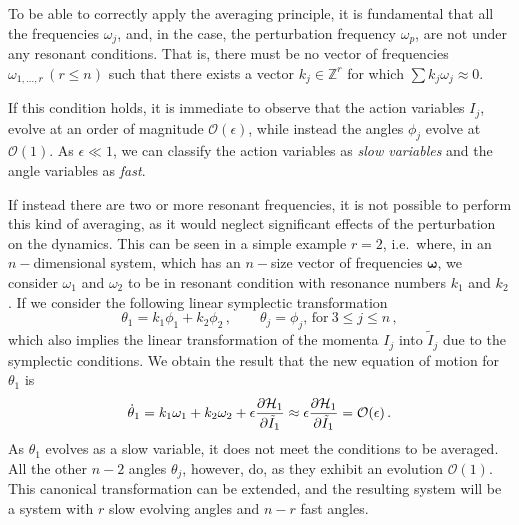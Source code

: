 To be able to correctly apply the averaging principle, it is fundamental that all the frequencies $\omega_j$, and, in the case, the perturbation frequency $\omega_p$, are not under any resonant conditions. That is, there must be no vector of frequencies $\omega_{1,\ldots,r}\,(r\leq n)$ such that there exists a vector $k_j \in \mathbb{Z}^r$ for which $\sum k_j \omega_j \approx 0$.

If this condition holds, it is immediate to observe that the action variables $I_j$, evolve at an order of magnitude $\mathcal{O}(\epsilon)$, while instead the angles $\phi_j$ evolve at $\mathcal{O}(1)$. As $\epsilon \ll 1$, we can classify the action variables as \textit{slow variables} and the angle variables as \textit{fast}.

If instead there are two or more resonant frequencies, it is not possible to perform this kind of averaging, as it would neglect significant effects of the perturbation on the dynamics. This can be seen in a simple example $r=2$, i.e.\ where, in an $n-$dimensional system, which has an $n-$size vector of frequencies $\boldsymbol{\omega}$, we consider $\omega_1$ and $\omega_2$ to be in resonant condition with resonance numbers $k_1$ and $k_2$. If we consider the following linear symplectic transformation
\begin{equation}
    \theta_1 = k_1 \phi_1 + k_2 \phi_2\,,\qquad \theta_j=\phi_j,\, \text{for}\ 3\leq j \leq n\,,
\end{equation}
which also implies the linear transformation of the momenta $I_j$ into $\tilde I_j$ due to the symplectic conditions. We obtain the result that the new equation of motion for $\theta_1$ is
\begin{equation}
    \dot\theta_1 = k_1\omega_1 + k_2\omega_2 + \epsilon \pdv{\mathcal{H}_1}{\tilde I_1} \approx \epsilon \pdv{\mathcal{H}_1}{\tilde I_1} = \mathcal{O}(\epsilon)\,.
\end{equation}
As $\theta_1$ evolves as a slow variable, it does not meet the conditions to be averaged. All the other $n - 2$ angles $\theta_j$, however, do, as they exhibit an evolution $\mathcal{O}(1)$. This canonical transformation can be extended, and the resulting system will be a system with $r$ slow evolving angles and $n - r$ fast angles.  



